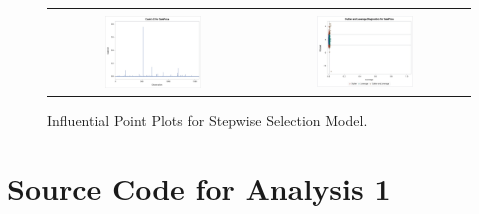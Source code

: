 \documentclass[11pt]{scrartcl} %
\begin{document}
\begin{figure}[H] %
	\centering
	\begin{tabular}{p{} p{}}
\hline	
	\multicolumn{1}{|c}{} &  \multicolumn{1}{c|}{} \\
		\multicolumn{1}{|c}{\includegraphics[width=0.48\textwidth]{../graphics/A2SWcooks}} &
		\multicolumn{1}{c|}{\includegraphics[width=0.48\textwidth]{../graphics/A2SWlev}}\\
		\hline
	\end{tabular}		
	\caption{Influential Point Plots for Stepwise Selection Model.}
	\label{fig:A2SWIP}
\end{figure}
\pagebreak

\section{Source Code for Analysis 1}
\label{sec:Analysis1}



\pagebreak
\end{document}
